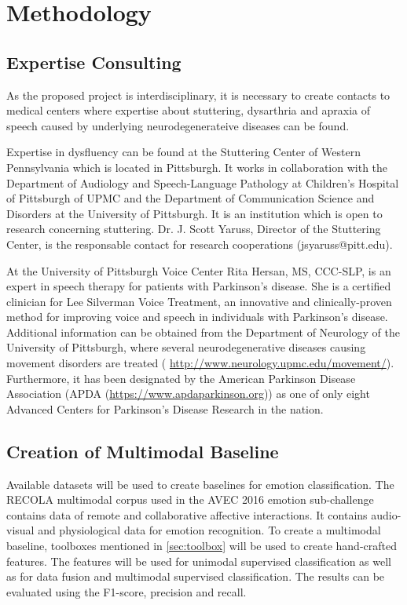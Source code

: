 \chapter{Methodology}
\label{cha:methods}



\section{Expertise Consulting}

As the proposed project is interdisciplinary, it is necessary to create contacts to medical centers where expertise about stuttering, dysarthria and apraxia of speech caused by underlying neurodegenerateive diseases can be found.

Expertise in dysfluency can be found at the Stuttering Center of Western Pennsylvania which is located in Pittsburgh. It works in collaboration with the Department of Audiology and Speech-Language Pathology at Children's Hospital of Pittsburgh of UPMC and the Department of Communication Science and Disorders at the University of Pittsburgh. It is an institution which is open to research concerning stuttering. Dr. J. Scott Yaruss, Director of the Stuttering Center, is the responsable contact for research cooperations (jsyaruss@pitt.edu).


At the University of Pittsburgh Voice Center Rita Hersan, MS, CCC-SLP, is an expert in speech therapy for patients with Parkinson's disease. She is a certified clinician for Lee Silverman Voice Treatment, an innovative and clinically-proven method for improving voice and speech in individuals with Parkinson's disease. Additional information can be obtained from the Department of Neurology of the University of Pittsburgh, where several neurodegenerative diseases causing movement disorders are treated (
\url{http://www.neurology.upmc.edu/movement/}). Furthermore, it has been designated by the American Parkinson Disease Association (APDA (\url{https://www.apdaparkinson.org})) as one of only eight Advanced Centers for Parkinson’s Disease Research in the nation.










\section{Creation of Multimodal Baseline}

Available datasets will be used to create baselines for emotion classification. The RECOLA multimodal corpus used in the AVEC 2016 emotion sub-challenge contains data of remote and collaborative affective interactions. It contains audio-visual and physiological data for emotion recognition. To create a multimodal baseline, toolboxes mentioned in \ref{sec:toolbox} will be used to create hand-crafted features. The features will be used for unimodal supervised classification as well as for data fusion and multimodal supervised classification.  The results can be evaluated using the F1-score, precision and recall.

